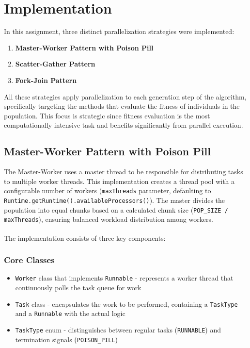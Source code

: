 \chapter{Implementation} \label{cap:implementation}


In this assignment, three distinct parallelization strategies were implemented:

\begin{enumerate}
    \item \textbf{Master-Worker Pattern with Poison Pill}
    \item \textbf{Scatter-Gather Pattern}
    \item \textbf{Fork-Join Pattern}
\end{enumerate}

All these strategies apply parallelization to each generation step of the algorithm, specifically targeting the methods that evaluate the fitness of individuals in the population. This focus is strategic since fitness evaluation is the most computationally intensive task and benefits significantly from parallel execution.

\section{Master-Worker Pattern with Poison Pill} \label{sec:master-worker}

The Master-Worker uses a master thread to be responsible for distributing tasks to multiple worker threads. This implementation creates a thread pool with a configurable number of workers (\texttt{maxThreads} parameter, defaulting to \texttt{Runtime.getRuntime().availableProcessors()}). The master divides the population into equal chunks based on a calculated chunk size (\texttt{POP\_SIZE / maxThreads}), ensuring balanced workload distribution among workers.
\\
\\
The implementation consists of three key components:

\subsection{Core Classes}

\begin{itemize}
    \item \texttt{Worker} class that implements \texttt{Runnable} - represents a worker thread that continuously polls the task queue for work
    \item \texttt{Task} class - encapsulates the work to be performed, containing a \texttt{TaskType} and a \texttt{Runnable} with the actual logic
    \item \texttt{TaskType} enum - distinguishes between regular tasks (\texttt{RUNNABLE}) and termination signals (\texttt{POISON\_PILL})
\end{itemize}

